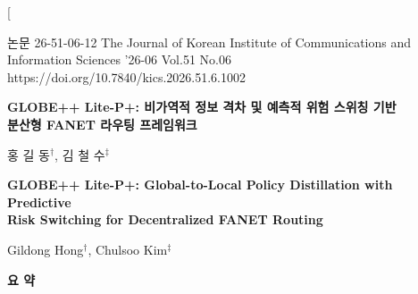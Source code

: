\documentclass[journal,twocolumn]{IEEEtran}
\begin{document}
\twocolumn[
  \begin{center}
    \noindent
    \begin{minipage}{\textwidth}
      \small
      논문 26-51-06-12 \hfill The Journal of Korean Institute of Communications and Information Sciences '26-06 Vol.51 No.06 \\
      \hfill https://doi.org/10.7840/kics.2026.51.6.1002
      \vspace{5mm}
    \end{minipage}
    
    \vspace{5mm}
    
    {\Large \bf GLOBE++ Lite-P+: 비가역적 정보 격차 및 예측적 위험 스위칭 기반\\ 분산형 FANET 라우팅 프레임워크}
    
    \vspace{5mm}
    
    {\large 홍 길 동$^\dagger$, 김 철 수$^\ddagger$}
    
    \vspace{5mm}
    
    {\Large \bf GLOBE++ Lite-P+: Global-to-Local Policy Distillation with Predictive\\ Risk Switching for Decentralized FANET Routing}
    
    \vspace{5mm}
    
    {\large Gildong Hong$^\dagger$, Chulsoo Kim$^\ddagger$}
    
    \vspace{8mm}
    
    {\bf 요 \quad 약}
    \vspace{3mm}
  \end{center}
  
\end{document}
